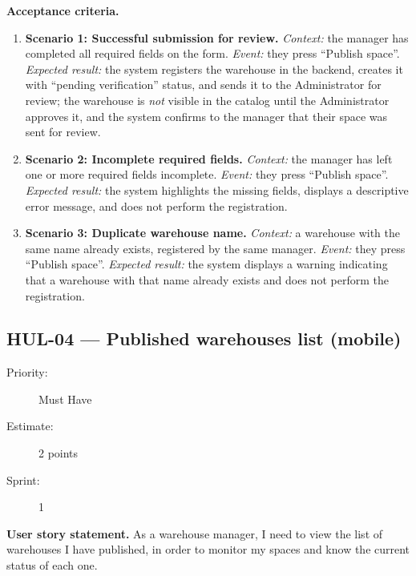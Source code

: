 \documentclass[11pt,a4paper,oneside]{report}
\begin{document}
\textbf{Acceptance criteria.}
\begin{enumerate}
\item \textbf{Scenario 1: Successful submission for review.} \emph{Context:} the manager has completed all required fields on the form. \emph{Event:} they press ``Publish space''. \emph{Expected result:} the system registers the warehouse in the backend, creates it with ``pending verification'' status, and sends it to the Administrator for review; the warehouse is \emph{not} visible in the catalog until the Administrator approves it, and the system confirms to the manager that their space was sent for review.
\item \textbf{Scenario 2: Incomplete required fields.} \emph{Context:} the manager has left one or more required fields incomplete. \emph{Event:} they press ``Publish space''. \emph{Expected result:} the system highlights the missing fields, displays a descriptive error message, and does not perform the registration.
\item \textbf{Scenario 3: Duplicate warehouse name.} \emph{Context:} a warehouse with the same name already exists, registered by the same manager. \emph{Event:} they press ``Publish space''. \emph{Expected result:} the system displays a warning indicating that a warehouse with that name already exists and does not perform the registration.
\end{enumerate}

\subsection{HUL-04 --- Published warehouses list (mobile)}
\label{req:HUL-04}
\begin{description}
\item[Priority:] Must Have \quad \item[Estimate:] 2 points \quad \item[Sprint:] 1
\end{description}

\textbf{User story statement.} As a warehouse manager, I need to view the list of warehouses I have published, in order to monitor my spaces and know the current status of each one.
\end{document}
